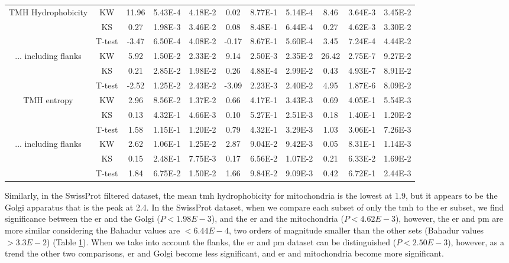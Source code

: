 \begin{table}[htbp]
\begin{tabular}{ccccccccccc}
        \midrule
        \multirow{3}[0]{*}{TMH Hydrophobicity} &  KW & 11.96 & 5.43E-4 & 4.18E-2 & 0.02  & 8.77E-1 & 5.14E-4 & 8.46  & 3.64E-3 & 3.45E-2 \\
                                &  KS & 0.27  & 1.98E-3 & 3.46E-2 & 0.08  & 8.48E-1 & 6.44E-4 & 0.27  & 4.62E-3 & 3.30E-2 \\
                                &  T-test & -3.47 & 6.50E-4 & 4.08E-2 & -0.17 & 8.67E-1 & 5.60E-4 & 3.45  & 7.24E-4 & 4.44E-2 \\
        \midrule
        \multirow{3}[0]{*}{... including flanks} &  KW & 5.92  & 1.50E-2 & 2.33E-2 & 9.14  & 2.50E-3 & 2.35E-2 & 26.42 & 2.75E-7 & 9.27E-2 \\
                                &  KS & 0.21  & 2.85E-2 & 1.98E-2 & 0.26  & 4.88E-4 & 2.99E-2 & 0.43  & 4.93E-7 & 8.91E-2 \\
                                &  T-test & -2.52 & 1.25E-2 & 2.43E-2 & -3.09 & 2.23E-3 & 2.40E-2 & 4.95  & 1.87E-6 & 8.09E-2 \\
      \midrule

        \multirow{3}[0]{*}{TMH entropy} &  KW & 2.96  & 8.56E-2 & 1.37E-2 & 0.66  & 4.17E-1 & 3.43E-3 & 0.69  & 4.05E-1 & 5.54E-3 \\
                                &  KS & 0.13  & 4.32E-1 & 4.66E-3 & 0.10  & 5.27E-1 & 2.51E-3 & 0.18 & 1.40E-1 & 1.20E-2 \\
                                &  T-test & 1.58  & 1.15E-1 & 1.20E-2 & 0.79  & 4.32E-1 & 3.29E-3 & 1.03 & 3.06E-1 & 7.26E-3 \\
        \midrule
        \multirow{3}[0]{*}{... including flanks} &  KW & 2.62  & 1.06E-1 & 1.25E-2 & 2.87  & 9.04E-2 & 9.42E-3 & 0.05 & 8.31E-1 & 1.14E-3 \\
                                &  KS & 0.15  & 2.48E-1 & 7.75E-3 & 0.17  & 6.56E-2 & 1.07E-2 & 0.21 & 6.33E-2 & 1.69E-2 \\
                                &  T-test & 1.84  & 6.75E-2 & 1.50E-2 & 1.66  & 9.84E-2 & 9.09E-3 & 0.42 & 6.72E-1 & 2.44E-3 \\
        \end{tabular}%
                        \label{table:organellesswissstats}
        \end{table}%

Similarly, in the SwissProt filtered dataset, the mean \gls{tmh} hydrophobicity for mitochondria is the lowest at 1.9, but it appears to be the Golgi apparatus that is the peak at 2.4.
In the SwissProt dataset, when we compare each subset of only the \gls{tmh} to the \gls{er} subset, we find significance between the \gls{er} and the Golgi ($P<1.98E-3$), and the \gls{er} and the mitochondria ($P<4.62E-3$), however, the \gls{er} and \gls{pm} are more similar considering the Bahadur values are $<6.44E-4$, two orders of magnitude smaller than the other sets (Bahadur values $>3.3E-2$) (Table \ref{table:organellesswissstats}).
When we take into account the flanks, the \gls{er} and \gls{pm} dataset can be distinguished ($P<2.50E-3$), however, as a trend the other two comparisons, \gls{er} and Golgi become less significant, and \gls{er} and mitochondria become more significant.

